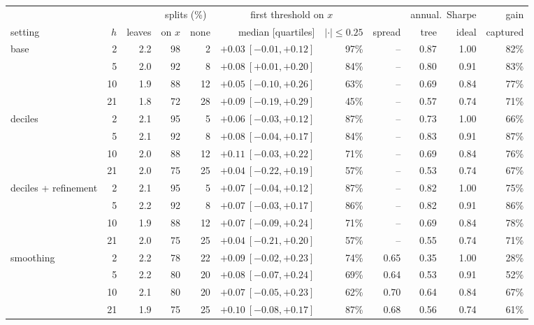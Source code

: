 \documentclass[11pt,a4paper]{article}
\newcommand{\1}{\mathbf{1}}
\begin{document}
\begin{table}[H]
\centering\footnotesize
\setlength{\tabcolsep}{3pt}
\begin{tabular}{@{}l r r rr r r r rr r@{}}
\toprule
& & & \multicolumn{2}{c}{splits (\%)} & \multicolumn{2}{c}{first threshold on $x$} & & \multicolumn{2}{c}{annual.\ Sharpe} & gain\\
\cmidrule(lr){4-5}\cmidrule(lr){6-7}\cmidrule(lr){9-10}
setting & $h$ & leaves & on $x$ & none & median [quartiles] & $|\cdot|\le0.25$ & spread & tree & ideal & captured\\
\midrule
base & 2 & 2.2 & 98 & 2 & $+0.03\ [-0.01,+0.12]$ & 97\% & -- & 0.87 & 1.00 & 82\%\\
 & 5 & 2.0 & 92 & 8 & $+0.08\ [+0.01,+0.20]$ & 84\% & -- & 0.80 & 0.91 & 83\%\\
 & 10 & 1.9 & 88 & 12 & $+0.05\ [-0.10,+0.26]$ & 63\% & -- & 0.69 & 0.84 & 77\%\\
 & 21 & 1.8 & 72 & 28 & $+0.09\ [-0.19,+0.29]$ & 45\% & -- & 0.57 & 0.74 & 71\%\\
\midrule
deciles & 2 & 2.1 & 95 & 5 & $+0.06\ [-0.03,+0.12]$ & 87\% & -- & 0.73 & 1.00 & 66\%\\
 & 5 & 2.1 & 92 & 8 & $+0.08\ [-0.04,+0.17]$ & 84\% & -- & 0.83 & 0.91 & 87\%\\
 & 10 & 2.0 & 88 & 12 & $+0.11\ [-0.03,+0.22]$ & 71\% & -- & 0.69 & 0.84 & 76\%\\
 & 21 & 2.0 & 75 & 25 & $+0.04\ [-0.22,+0.19]$ & 57\% & -- & 0.53 & 0.74 & 67\%\\
\midrule
deciles + refinement & 2 & 2.1 & 95 & 5 & $+0.07\ [-0.04,+0.12]$ & 87\% & -- & 0.82 & 1.00 & 75\%\\
 & 5 & 2.2 & 92 & 8 & $+0.07\ [-0.03,+0.17]$ & 86\% & -- & 0.82 & 0.91 & 86\%\\
 & 10 & 1.9 & 88 & 12 & $+0.07\ [-0.09,+0.24]$ & 71\% & -- & 0.69 & 0.84 & 78\%\\
 & 21 & 2.0 & 75 & 25 & $+0.04\ [-0.21,+0.20]$ & 57\% & -- & 0.55 & 0.74 & 71\%\\
\midrule
smoothing & 2 & 2.2 & 78 & 22 & $+0.09\ [-0.02,+0.23]$ & 74\% & 0.65 & 0.35 & 1.00 & 28\%\\
 & 5 & 2.2 & 80 & 20 & $+0.08\ [-0.07,+0.24]$ & 69\% & 0.64 & 0.53 & 0.91 & 52\%\\
 & 10 & 2.1 & 80 & 20 & $+0.07\ [-0.05,+0.23]$ & 62\% & 0.70 & 0.64 & 0.84 & 67\%\\
 & 21 & 1.9 & 75 & 25 & $+0.10\ [-0.08,+0.17]$ & 87\% & 0.68 & 0.56 & 0.74 & 61\%\\

\end{tabular}
\end{table}
\end{document}
